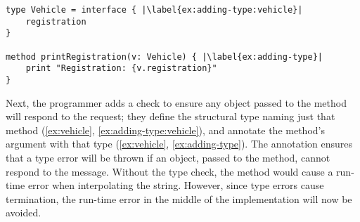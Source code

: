 \begin{lstlisting}[label={ex:vehicle},caption={Adding a type annotation to a method parameter.},escapechar=|,columns=flexible,float,floatplacement=H]
type Vehicle = interface { |\label{ex:adding-type:vehicle}|
    registration    
}

method printRegistration(v: Vehicle) { |\label{ex:adding-type}|
    print "Registration: {v.registration}"
}
\end{lstlisting}

Next, the programmer adds a check to ensure any object passed to the
 method will respond to the
 request; 
they define the structural type \citep{theCleanVehicle}
naming just that method (\cref{ex:vehicle}, \cref{ex:adding-type:vehicle}), 
and annotate the  method's
argument with that type (\cref{ex:vehicle}, \cref{ex:adding-type}).
The annotation ensures that a type error will be thrown if an object,
passed to the  method,
cannot respond to the  message.
Without the type check, the  method would
cause a run-time error when interpolating the string.
However, since type errors cause termination, 
the run-time error in the middle of the
 implementation
will now be avoided.





